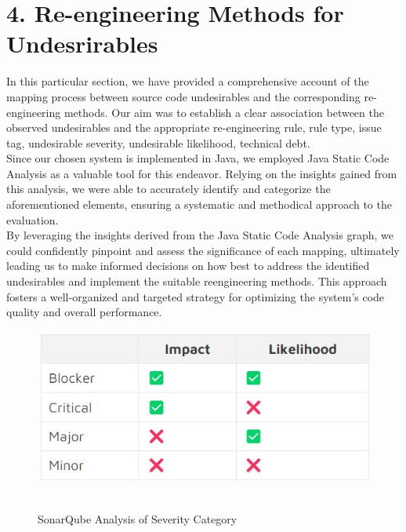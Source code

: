 \documentclass[12pt,letterpaper]{report}
\begin{document}
\section*{4. Re-engineering Methods for Undesrirables}
\normalsize {
In this particular section, we have provided a comprehensive account of the mapping process between source code undesirables and the corresponding re-engineering methods. Our aim was to establish a clear association between the observed undesirables and the appropriate re-engineering rule, rule type, issue tag, undesirable severity, undesirable likelihood, technical debt.\\

Since our chosen system is implemented in Java, we employed Java Static Code Analysis as a valuable tool for this endeavor. Relying on the insights gained from this analysis, we were able to accurately identify and categorize the aforementioned elements, ensuring a systematic and methodical approach to the evaluation.\\

By leveraging the insights derived from the Java Static Code Analysis graph, we could confidently pinpoint and assess the significance of each mapping, ultimately leading us to make informed decisions on how best to address the identified undesirables and implement the suitable reengineering methods. This approach fosters a well-organized and targeted strategy for optimizing the system's code quality and overall performance.\\

\begin{figure}[h!]
    \centering
    \includegraphics[width=0.7\linewidth]{Images/Severity_report.jpeg}\
    \caption{SonarQube Analysis of Severity Category}
    \label{fig:enter-label}
\end{figure}

}
\end{document}
